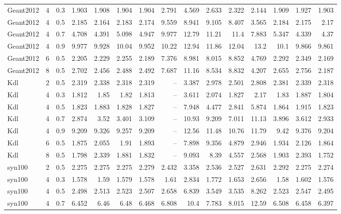 \begin{table}
\begin{tabular}{lrrrrrrrrrrrrrr}
Geant2012 & 4 & 0.3 & 1.903 & 1.908 & 1.904 & 1.904 & 2.791 & 4.569 & 2.633 & 2.322 & 2.144 & 1.909 & 1.927 & 1.903 \\
Geant2012 & 4 & 0.5 & 2.185 & 2.164 & 2.183 & 2.174 & 9.559 & 8.941 & 9.105 & 8.407 & 3.565 & 2.184 & 2.175 & 2.17 \\
Geant2012 & 4 & 0.7 & 4.708 & 4.391 & 5.098 & 4.947 & 9.977 & 12.79 & 11.21 & 11.4 & 7.883 & 5.347 & 4.339 & 4.37 \\
Geant2012 & 4 & 0.9 & 9.977 & 9.928 & 10.04 & 9.952 & 10.22 & 12.94 & 11.86 & 12.04 & 13.2 & 10.1 & 9.866 & 9.861 \\
Geant2012 & 6 & 0.5 & 2.205 & 2.229 & 2.255 & 2.189 & 7.376 & 8.981 & 8.015 & 8.852 & 4.769 & 2.292 & 2.349 & 2.169 \\
Geant2012 & 8 & 0.5 & 2.702 & 2.456 & 2.488 & 2.492 & 7.687 & 11.16 & 8.534 & 8.832 & 4.207 & 2.655 & 2.756 & 2.187 \\
Kdl & 2 & 0.5 & 2.319 & 2.338 & 2.318 & 2.319 & -- & 3.387 & 2.978 & 2.501 & 2.808 & 2.381 & 2.339 & 2.318 \\
Kdl & 4 & 0.3 & 1.812 & 1.85 & 1.82 & 1.813 & -- & 3.611 & 2.074 & 1.827 & 2.17 & 1.83 & 1.887 & 1.804 \\
Kdl & 4 & 0.5 & 1.823 & 1.883 & 1.828 & 1.827 & -- & 7.948 & 4.477 & 2.841 & 5.874 & 1.864 & 1.915 & 1.823 \\
Kdl & 4 & 0.7 & 2.874 & 3.52 & 3.401 & 3.109 & -- & 10.93 & 9.209 & 7.011 & 11.13 & 3.896 & 3.612 & 2.933 \\
Kdl & 4 & 0.9 & 9.209 & 9.326 & 9.257 & 9.209 & -- & 12.56 & 11.48 & 10.76 & 11.79 & 9.42 & 9.376 & 9.204 \\
Kdl & 6 & 0.5 & 1.875 & 2.055 & 1.91 & 1.893 & -- & 7.898 & 9.356 & 4.879 & 2.946 & 1.934 & 2.126 & 1.864 \\
Kdl & 8 & 0.5 & 1.798 & 2.339 & 1.881 & 1.832 & -- & 9.093 & 8.39 & 4.557 & 2.568 & 1.903 & 2.393 & 1.752 \\
syn100 & 2 & 0.5 & 2.275 & 2.275 & 2.275 & 2.279 & 2.432 & 3.358 & 2.536 & 2.527 & 2.631 & 2.292 & 2.275 & 2.274 \\
syn100 & 4 & 0.3 & 1.578 & 1.59 & 1.579 & 1.578 & 1.61 & 2.834 & 1.772 & 1.653 & 2.656 & 1.58 & 1.602 & 1.576 \\
syn100 & 4 & 0.5 & 2.498 & 2.513 & 2.523 & 2.507 & 2.658 & 6.839 & 3.549 & 3.535 & 8.262 & 2.523 & 2.547 & 2.495 \\
syn100 & 4 & 0.7 & 6.452 & 6.46 & 6.48 & 6.468 & 6.808 & 10.4 & 7.783 & 8.015 & 12.59 & 6.508 & 6.458 & 6.397 \\

\end{tabular}
\end{table}
